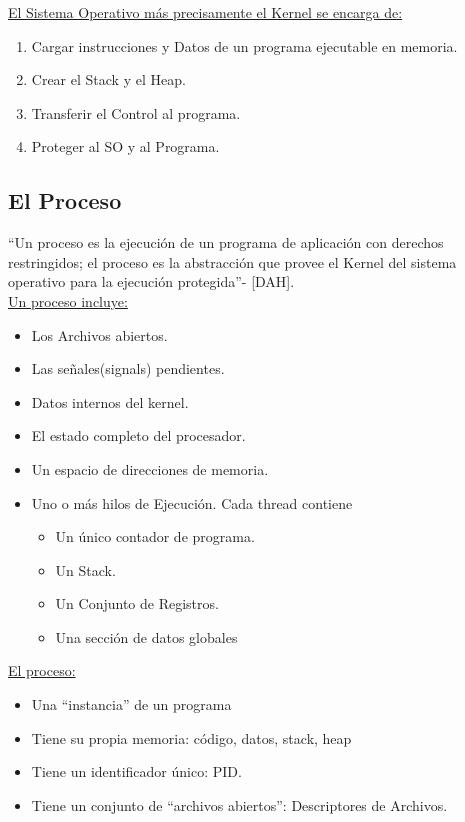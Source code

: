 \documentclass[../main.tex]{subfiles}
\begin{document}
    \underline{El Sistema Operativo más precisamente el Kernel se encarga de:}
    \begin{enumerate}
        \item Cargar instrucciones y Datos de un programa ejecutable en memoria.
        \item Crear el Stack y el Heap.
        \item Transferir el Control al programa.
        \item Proteger al SO y al Programa.
    \end{enumerate}

\subsection{El Proceso}
    “Un proceso es la ejecución de un programa de aplicación con derechos restringidos; el proceso es la abstracción que provee el Kernel del sistema operativo para la ejecución protegida”- [DAH].\\

    \underline{Un proceso incluye:}
    \begin{itemize}
        \item Los Archivos abiertos.
        \item Las señales(signals) pendientes.
        \item Datos internos del kernel.
        \item El estado completo del procesador.
        \item Un espacio de direcciones de memoria.
        \item Uno o más hilos de Ejecución. Cada thread contiene
            \begin{itemize}
                \item Un único contador de programa.
                \item Un Stack.
                \item Un Conjunto de Registros.
                \item Una sección de datos globales
            \end{itemize}    
    \end{itemize}
    
    \underline{El proceso:}
    \begin{itemize}
        \item Una “instancia” de un programa
        \item Tiene su propia memoria: código, datos, stack, heap
        \item Tiene un identificador único: PID.
        \item Tiene un conjunto de “archivos abiertos”: Descriptores de Archivos.
    \end{itemize}
    
\end{document}
